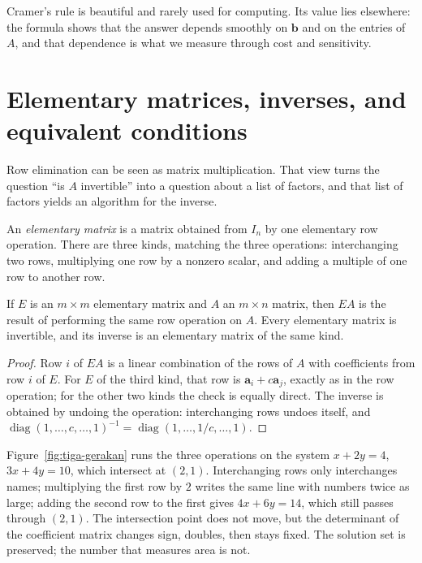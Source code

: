 Cramer's rule is beautiful and rarely used for computing. Its value lies elsewhere: the formula
shows that the answer depends smoothly on $\mathbf{b}$ and on the entries of $A$, and that
dependence is what we measure through cost and sensitivity.

\section{Elementary matrices, inverses, and equivalent conditions}

Row elimination can be seen as matrix multiplication. That view turns the question ``is $A$
invertible'' into a question about a list of factors, and that list of factors yields an
algorithm for the inverse.


\begin{definisi}
An \emph{elementary matrix} is a matrix obtained from $I_{n}$ by one elementary row operation.
There are three kinds, matching the three operations: interchanging two rows, multiplying one
row by a nonzero scalar, and adding a multiple of one row to another row.
\end{definisi}

\begin{lemma}
If $E$ is an $m\times m$ elementary matrix and $A$ an $m\times n$ matrix, then $EA$ is the
result of performing the same row operation on $A$. Every elementary matrix is invertible, and
its inverse is an elementary matrix of the same kind.
\end{lemma}

\begin{proof}
Row $i$ of $EA$ is a linear combination of the rows of $A$ with coefficients from row $i$ of
$E$. For $E$ of the third kind, that row is $\mathbf{a}_{i}+c\mathbf{a}_{j}$, exactly as in the
row operation; for the other two kinds the check is equally direct. The inverse is obtained by
undoing the operation: interchanging rows undoes itself, and
$\operatorname{diag}(1,\dots,c,\dots,1)^{-1}=\operatorname{diag}(1,\dots,1/c,\dots,1)$.
\end{proof}

Figure~\ref{fig:tiga-gerakan} runs the three operations on the system $x+2y=4$, $3x+4y=10$,
which intersect at $(2,1)$. Interchanging rows only interchanges names; multiplying the first
row by $2$ writes the same line with numbers twice as large; adding the second row to the first
gives $4x+6y=14$, which still passes through $(2,1)$. The intersection point does not move, but
the determinant of the coefficient matrix changes sign, doubles, then stays fixed. The solution
set is preserved; the number that measures area is not.

